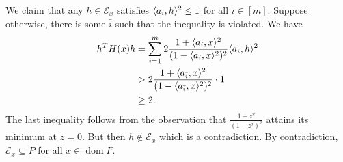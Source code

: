 \documentclass[10pt]{article}
\DeclarePairedDelimiter{\iprod}{\langle}{\rangle}
\DeclareMathOperator{\dom}{dom}
\newcommand{\sset}{\subseteq}
\newcommand{\mcal}{\mathcal}
\begin{document}
We claim that any $h\in \mcal E_x$ satisfies $\iprod{a_i, h}^2\leq 1$ for all $i\in [m]$.
Suppose otherwise,
there is some $\bar i$ such that the inequality is violated.
We have
\begin{align*}
  h^TH(x)h
  &= \sum_{i=1}^m 2\frac{1+\iprod{a_i, x}^2}{(1-\iprod{a_i, x}^2)^2} \iprod{a_i, h}^2 \\
  &> 2\frac{1+\iprod{a_{\bar i}, x}^2}{(1-\iprod{a_{\bar i}, x}^2)^2}\cdot 1 \\
  &\geq 2.
\end{align*}
The last inequality follows from the observation that $\frac{1+z^2}{(1-z^2)^2}$ attains its minimum at $z=0$.
But then $h\notin \mcal E_x$ which is a contradiction.
By contradiction,
$\mcal E_x\sset P$ for all $x\in \dom F$.
\end{document}
